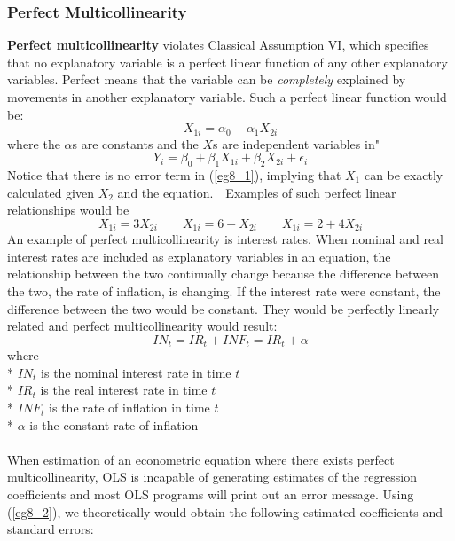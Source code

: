 \documentclass[11pt]{article}
\begin{document}
\subsubsection{Perfect Multicollinearity}
\textbf{Perfect multicollinearity} violates Classical Assumption VI, which specifies that no explanatory variable is a perfect linear function of any other explanatory variables.  Perfect means that the variable can be \textit{completely} explained by movements in another explanatory variable. Such a perfect linear function would be:
\begin{equation}
X_{1i} = \alpha_0 + \alpha_1X_{2i} \label{eg8_1}
\end{equation}
where the $\alpha$s are constants and the $X$s are independent variables in"
\begin{equation}
Y_i = \beta_0 + \beta_1X_{1i} + \beta_2X_{2i} + \epsilon_i \label{eg8_2}
\end{equation}
Notice that there is no error term in (\ref{eg8_1}), implying that $X_1$ can be exactly calculated given $X_2$ and the equation.　Examples of such perfect linear relationships would be
\begin{equation}
X_{1i} = 3X_{2i} \quad\quad X_{1i}= 6+X_{2i} \quad\quad X_{1i} = 2+4X_{2i} \label{eg8_3}
\end{equation}
An example of perfect multicollinearity is interest rates. When nominal and real interest rates are included as explanatory variables in an equation, the relationship between the two continually change because the difference between the two, the rate of inflation, is changing. If the interest rate were constant, the difference between the two would be constant. They would be perfectly linearly related and perfect multicollinearity would result:
\begin{equation}
IN_t = IR_t  + INF_t = IR_t + \alpha \label{eg8_4}
\end{equation}
where\\*
$IN_t$ is the nominal interest rate in time $t$\\*
$IR_t$ is the real interest rate in time $t$\\*
$INF_t$ is the rate of inflation in time $t$\\*
$\alpha$ is the constant rate of inflation\\ \\
When estimation of an econometric equation where there exists perfect multicollinearity, OLS is incapable of generating estimates of the regression coefficients and most OLS programs will print out an error message. Using (\ref{eg8_2}), we theoretically would obtain the following estimated coefficients and standard errors:
\end{document}
